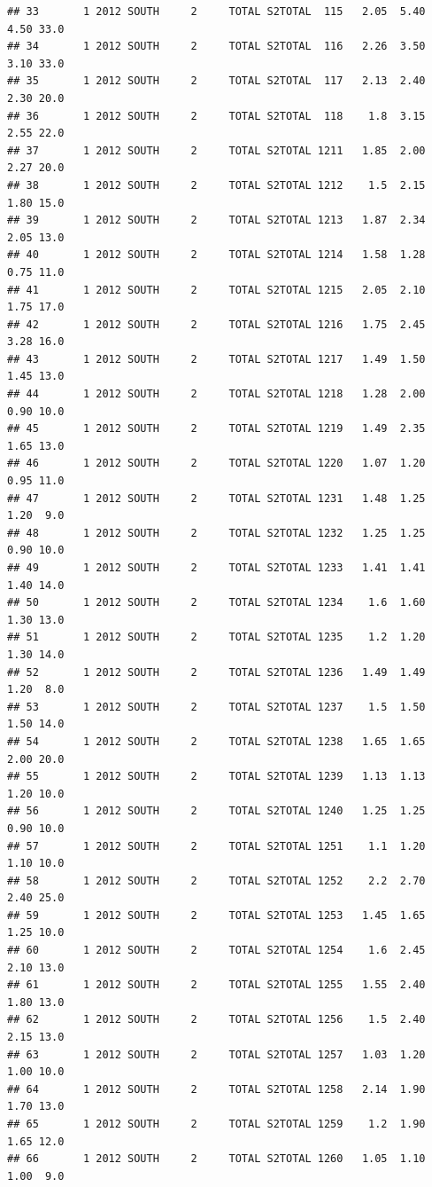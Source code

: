 \documentclass[
]{article}
\begin{document}
\begin{verbatim}
## 33       1 2012 SOUTH     2     TOTAL S2TOTAL  115   2.05  5.40  4.50 33.0
## 34       1 2012 SOUTH     2     TOTAL S2TOTAL  116   2.26  3.50  3.10 33.0
## 35       1 2012 SOUTH     2     TOTAL S2TOTAL  117   2.13  2.40  2.30 20.0
## 36       1 2012 SOUTH     2     TOTAL S2TOTAL  118    1.8  3.15  2.55 22.0
## 37       1 2012 SOUTH     2     TOTAL S2TOTAL 1211   1.85  2.00  2.27 20.0
## 38       1 2012 SOUTH     2     TOTAL S2TOTAL 1212    1.5  2.15  1.80 15.0
## 39       1 2012 SOUTH     2     TOTAL S2TOTAL 1213   1.87  2.34  2.05 13.0
## 40       1 2012 SOUTH     2     TOTAL S2TOTAL 1214   1.58  1.28  0.75 11.0
## 41       1 2012 SOUTH     2     TOTAL S2TOTAL 1215   2.05  2.10  1.75 17.0
## 42       1 2012 SOUTH     2     TOTAL S2TOTAL 1216   1.75  2.45  3.28 16.0
## 43       1 2012 SOUTH     2     TOTAL S2TOTAL 1217   1.49  1.50  1.45 13.0
## 44       1 2012 SOUTH     2     TOTAL S2TOTAL 1218   1.28  2.00  0.90 10.0
## 45       1 2012 SOUTH     2     TOTAL S2TOTAL 1219   1.49  2.35  1.65 13.0
## 46       1 2012 SOUTH     2     TOTAL S2TOTAL 1220   1.07  1.20  0.95 11.0
## 47       1 2012 SOUTH     2     TOTAL S2TOTAL 1231   1.48  1.25  1.20  9.0
## 48       1 2012 SOUTH     2     TOTAL S2TOTAL 1232   1.25  1.25  0.90 10.0
## 49       1 2012 SOUTH     2     TOTAL S2TOTAL 1233   1.41  1.41  1.40 14.0
## 50       1 2012 SOUTH     2     TOTAL S2TOTAL 1234    1.6  1.60  1.30 13.0
## 51       1 2012 SOUTH     2     TOTAL S2TOTAL 1235    1.2  1.20  1.30 14.0
## 52       1 2012 SOUTH     2     TOTAL S2TOTAL 1236   1.49  1.49  1.20  8.0
## 53       1 2012 SOUTH     2     TOTAL S2TOTAL 1237    1.5  1.50  1.50 14.0
## 54       1 2012 SOUTH     2     TOTAL S2TOTAL 1238   1.65  1.65  2.00 20.0
## 55       1 2012 SOUTH     2     TOTAL S2TOTAL 1239   1.13  1.13  1.20 10.0
## 56       1 2012 SOUTH     2     TOTAL S2TOTAL 1240   1.25  1.25  0.90 10.0
## 57       1 2012 SOUTH     2     TOTAL S2TOTAL 1251    1.1  1.20  1.10 10.0
## 58       1 2012 SOUTH     2     TOTAL S2TOTAL 1252    2.2  2.70  2.40 25.0
## 59       1 2012 SOUTH     2     TOTAL S2TOTAL 1253   1.45  1.65  1.25 10.0
## 60       1 2012 SOUTH     2     TOTAL S2TOTAL 1254    1.6  2.45  2.10 13.0
## 61       1 2012 SOUTH     2     TOTAL S2TOTAL 1255   1.55  2.40  1.80 13.0
## 62       1 2012 SOUTH     2     TOTAL S2TOTAL 1256    1.5  2.40  2.15 13.0
## 63       1 2012 SOUTH     2     TOTAL S2TOTAL 1257   1.03  1.20  1.00 10.0
## 64       1 2012 SOUTH     2     TOTAL S2TOTAL 1258   2.14  1.90  1.70 13.0
## 65       1 2012 SOUTH     2     TOTAL S2TOTAL 1259    1.2  1.90  1.65 12.0
## 66       1 2012 SOUTH     2     TOTAL S2TOTAL 1260   1.05  1.10  1.00  9.0

\end{verbatim}
\end{document}
